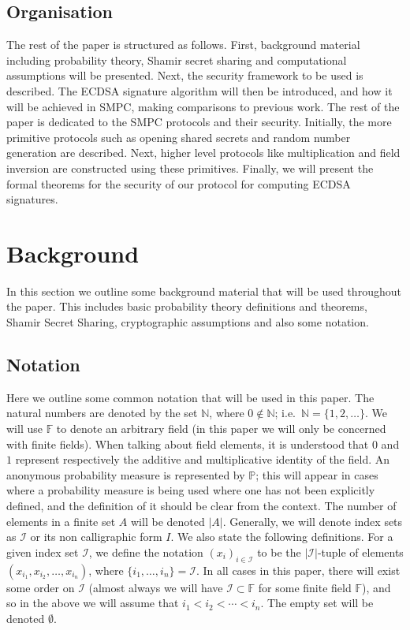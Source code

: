 \documentclass{article}
\newcommand\paper{paper}
\theoremstyle{remark}
\newcommand{\N}{\mathbb{N}}
\newcommand{\F}{\mathbb{F}}
\renewcommand{\P}{\mathbb{P}}
\begin{document}
\subsection{Organisation}

The rest of the \paper{} is structured as follows. First, background material
including probability theory, Shamir secret sharing and computational
assumptions will be presented. Next, the security framework to be used is
described. The ECDSA signature algorithm will then be introduced, and how it
will be achieved in SMPC, making comparisons to previous work. The rest of the
paper is dedicated to the SMPC protocols and their security. Initially, the
more primitive protocols such as opening shared secrets and random number
generation are described. Next, higher level protocols like multiplication and
field inversion are constructed using these primitives. Finally, we will
present the formal theorems for the security of our protocol for computing
ECDSA signatures.

\section{Background}

In this section we outline some background material that will be used
throughout the \paper{}. This includes basic probability theory definitions and
theorems, Shamir Secret Sharing, cryptographic assumptions and also some
notation.

\subsection{Notation}

Here we outline some common notation that will be used in this \paper{}. The
natural numbers are denoted by the set $\N$, where $0 \notin \N$; i.e.\ $\N =
\{1, 2, \ldots\}$. We will use $\F$ to denote an arbitrary field (in this
\paper{} we will only be concerned with finite fields). When talking about
field elements, it is understood that $0$ and $1$ represent respectively the
additive and multiplicative identity of the field. An anonymous probability
measure is represented by $\P$; this will appear in cases where a probability
measure is being used where one has not been explicitly defined, and the
definition of it should be clear from the context. The number of elements in a
finite set $A$ will be denoted $|A|$. Generally, we will denote index sets as
$\mathcal{I}$ or its non calligraphic form $I$. We also state the following
definitions. For a given index set $\mathcal{I}$, we define the notation
${(x_i)}_{i \in \mathcal{I}}$ to be the $|\mathcal{I}|$-tuple of elements
$(x_{i_1}, x_{i_2}, \ldots, x_{i_n})$, where $\{i_1, \ldots, i_n\} =
\mathcal{I}$. In all cases in this \paper{}, there will exist some order on
$\mathcal{I}$ (almost always we will have $\mathcal{I} \subset \F$ for some
finite field $\F$), and so in the above we will assume that $i_1 < i_2 < \cdots
< i_n$. The empty set will be denoted $\emptyset$.
\end{document}
